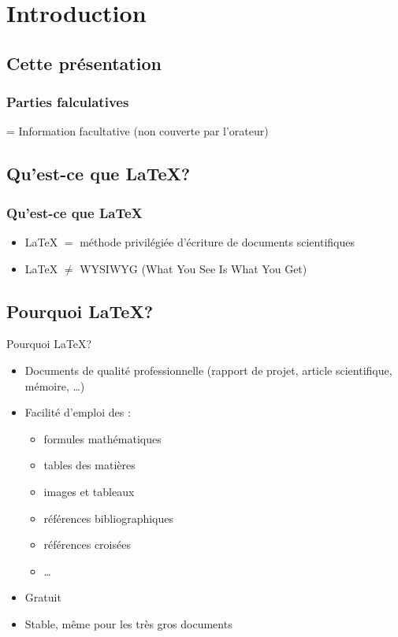 \section{Introduction}
\subsection{Cette présentation}
\begin{frame}
  \frametitle{Parties falculatives}
  \begin{center}
      \Warning = Information facultative (non couverte par l'orateur)
  \end{center}
\end{frame}
\subsection{Qu'est-ce que \LaTeX{}?}

\begin{frame}
\frametitle{Qu'est-ce que \LaTeX}
\begin{itemize}
\item \LaTeX{} $=$ méthode privilégiée d'écriture de documents scientifiques
 \vspace{0.5cm}
\item \LaTeX{} $ \neq$ WYSIWYG (What You See Is What You Get)
\end{itemize}
\end{frame}

\subsection{Pourquoi \LaTeX{}?}

\begin{frame}{Pourquoi \LaTeX{}?}
  \begin{itemize}
      \item Documents de qualité professionnelle (rapport de projet, article scientifique, mémoire, \ldots{})
    \item Facilité d'emploi des :
    \begin{itemize}
        \item formules mathématiques
        \item tables des matières
        \item images et tableaux
        \item références bibliographiques
        \item références croisées
        \item \ldots{}
    \end{itemize}
    \item Gratuit
    \item Stable, même pour les très gros documents
  \end{itemize}
\end{frame}



